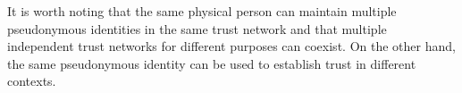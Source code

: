    It is worth noting that the same physical person can maintain multiple pseudonymous identities in the same trust network
   and that multiple independent trust networks for different purposes can coexist. On the other hand, the same
   pseudonymous identity can be used to establish trust in different contexts.
